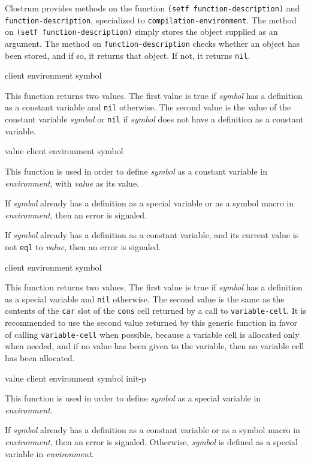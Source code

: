 Clostrum provides methods on the function \texttt{(setf
  function-description)} and \texttt{function-description},
specialized to \texttt{compilation-environment}.  The method on
\texttt{(setf function-description)} simply stores the object supplied
as an argument.  The method on \texttt{function-description} checks
whether an object has been stored, and if so, it returns that object.
If not, it returns \texttt{nil}.

 {client environment symbol}

This function returns two values. The first value is true if
\textit{symbol} has a definition as a constant variable and
\texttt{nil} otherwise. The second value is the value of the constant
variable \textit{symbol} or \texttt{nil} if \textit{symbol} does not
have a definition as a constant variable.

 {value client environment symbol}

This function is used in order to define \textit{symbol} as a constant
variable in \textit{environment}, with \textit{value} as its value.

If \textit{symbol} already has a definition as a special variable or
as a symbol macro in \textit{environment}, then an error is signaled.

If \textit{symbol} already has a definition as a constant variable,
and its current value is not \texttt{eql} to \textit{value}, then an
error is signaled.

 {client environment symbol}

This function returns two values. The first value is true if
\textit{symbol} has a definition as a special variable and
\texttt{nil} otherwise.  The second value is the same as the contents
of the \texttt{car} slot of the \texttt{cons} cell returned by a call
to \texttt{variable-cell}.  It is recommended to use the second value
returned by this generic function in favor of calling
\texttt{variable-cell} when possible, because a variable cell is
allocated only when needed, and if no value has been given to the
variable, then no variable cell has been allocated.

 {value client environment symbol init-p}

This function is used in order to define \textit{symbol} as a special
variable in \textit{environment}.

If \textit{symbol} already has a definition as a constant variable or
as a symbol macro in \textit{environment}, then an error is signaled.
Otherwise, \textit{symbol} is defined as a special variable in
\textit{environment}.

